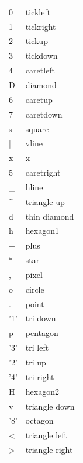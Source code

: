 \documentclass{article}
\begin{document}
\begin{multicols}{2}
\begin{tabular}{ l l }
0 & tickleft\\
1 & tickright\\
2 & tickup\\
3 & tickdown\\
4 & caretleft\\
D & diamond\\
6 & caretup\\
7 & caretdown\\
s & square\\
| & vline\\
x & x\\
5 & caretright\\
\_ & hline\\
\^{} & triangle up\\
d & thin diamond\\
h & hexagon1\\
+ & plus\\
* & star\\
, & pixel\\
o & circle\\
. & point\\
'1' & tri down\\
p & pentagon\\
'3' & tri left\\
'2' & tri up\\
'4' & tri right\\
H & hexagon2\\
v & triangle down\\
'8' & octagon\\
\textless & triangle left\\
\textgreater & triangle right
\end{tabular}

\end{multicols}



\end{document}
